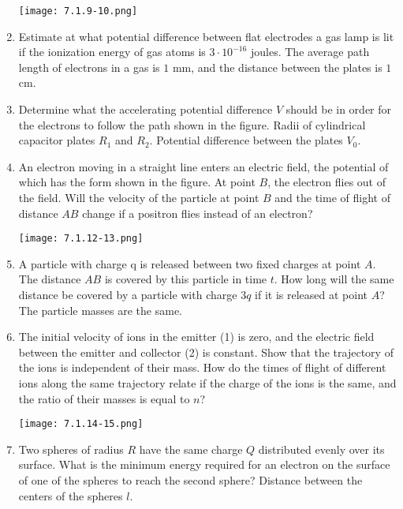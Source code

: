 \documentclass{article}
\begin{document}
\begin{enumerate}[label=7.1.\arabic*]
\begin{center}
    \texttt{[image: 7.1.9-10.png]}
\end{center}

\item Estimate at what potential difference between flat electrodes a gas lamp is lit if the ionization energy of gas atoms is $3 \cdot 10^{-16}$ joules. The average path length of electrons in a gas is $1$ mm, and the distance between the plates is $1$ cm.



\item Determine what the accelerating potential difference $V$ should be in order for the electrons to follow the path shown in the figure. Radii of cylindrical capacitor plates $R_1$ and $R_2$. Potential difference between the plates $V_0$.

\item An electron moving in a straight line enters an electric field, the potential of which has the form shown in the figure. At point $B$, the electron flies out of the field. Will the velocity of the particle at point $B$ and the time of flight of distance $AB$ change if a positron flies instead of an electron?

\begin{center}
    \texttt{[image: 7.1.12-13.png]}
\end{center}

\item A particle with charge q is released between two fixed charges at point $A$. The distance $AB$ is covered by this particle in time $t$. How long will the same distance be covered by a particle with charge $3q$ if it is released at point $A$? The particle masses are the same.

\item The initial velocity of ions in the emitter (1) is zero, and the electric field between the emitter and collector (2) is constant. Show that the trajectory of the ions is independent of their mass. How do the times of flight of different ions along the same trajectory relate if the charge of the ions is the same, and the ratio of their masses is equal to $n$?

\begin{center}
    \texttt{[image: 7.1.14-15.png]}
\end{center}

\item Two spheres of radius $R$ have the same charge $Q$ distributed evenly over its surface. What is the minimum energy required for an electron on the surface of one of the spheres to reach the second sphere? Distance between the centers of the spheres $l$.


\end{enumerate}
\end{document}
